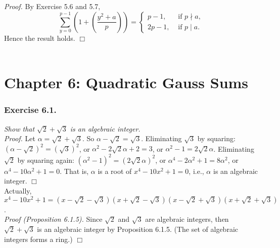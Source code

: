 \documentclass{article}
\begin{document}
\emph{Proof.}
By Exercise 5.6 and 5.7,
\begin{equation*}
  \sum_{y=0}^{p-1} \left( 1 + \left( \frac{y^2 + a}{p} \right) \right) =
    \begin{cases}
      p-1,  & \text{ if $p \nmid a$}, \\
      2p-1, & \text{ if $p \mid a$}.
    \end{cases}
\end{equation*}
Hence the result holds.
$\Box$ \\\\






\newpage
\section*{Chapter 6: Quadratic Gauss Sums \\}



\subsubsection*{Exercise 6.1.}
\emph{Show that $\sqrt{2} + \sqrt{3}$ is an algebraic integer.} \\

\emph{Proof.}
Let $\alpha = \sqrt{2} + \sqrt{3}$. So $\alpha - \sqrt{2} = \sqrt{3}$.
Eliminating $\sqrt{3}$ by squaring:
$(\alpha - \sqrt{2})^2 = (\sqrt{3})^2$, or
$\alpha^2 - 2\sqrt{2}\alpha + 2 = 3$, or
$\alpha^2 - 1 = 2\sqrt{2}\alpha$.
Eliminating $\sqrt{2}$ by squaring again:
$(\alpha^2 - 1)^2 = (2\sqrt{2}\alpha)^2$, or
$\alpha^4 - 2 \alpha^2 + 1 = 8 \alpha^2$, or
$\alpha^4 - 10 \alpha^2 + 1 = 0$.
That is, $\alpha$ is a root of $x^4 - 10x^2 + 1 = 0$, i.e.,
$\alpha$ is an algebraic integer.
$\Box$ \\

Actually,
$x^4 - 10x^2 + 1 =
(x - \sqrt{2} - \sqrt{3})(x + \sqrt{2} - \sqrt{3})
(x - \sqrt{2} + \sqrt{3})(x + \sqrt{2} + \sqrt{3})$. \\

\emph{Proof (Proposition 6.1.5).}
Since $\sqrt{2}$ and $\sqrt{3}$ are algebraic integers,
then $\sqrt{2} + \sqrt{3}$ is an algebraic integer by Proposition 6.1.5.
(The set of algebraic integers forms a ring.)
$\Box$ \\\\
\end{document}
